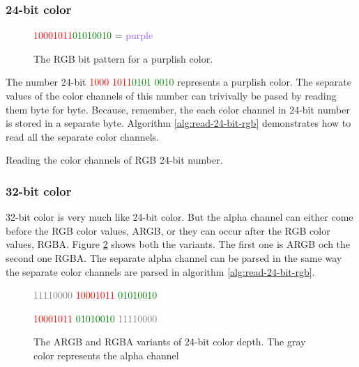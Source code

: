 \subsubsection{24-bit color}

\begin{figure}
  \centering
  {\huge\textcolor{red}{10001011}\textcolor{green}{01010010}\textcolor{blue}{\fullbyte}
    = \textcolor[HTML]{8B52FF}{purple}}
  \caption{The RGB bit pattern for a purplish color.}
  \label{fig:24-bit-colors-bits}
\end{figure}

The number 24-bit \textcolor{red}{1000 1011}\textcolor{green}{0101
  0010}\textcolor{blue}{\fullbyte} represents a purplish color. The
separate values of the color channels of this number can trivivally
be pased by reading them byte for byte. Because, remember, the each
color channel in 24-bit number is stored in a separate
byte. Algorithm \ref{alg:read-24-bit-rgb} demonstrates how to read
all the separate color channels.


\begin{algorithm}[H]
  \caption{Reading the color channels of RGB 24-bit number.}
  \label{alg:read-24-bit-rgb}
  \begin{algorithmic}[1]
  \end{algorithmic}
\end{algorithm}

\subsubsection{32-bit color}

32-bit color is very much like 24-bit color. But the alpha channel
can either come before the RGB color values, ARGB, or
they can occur after the RGB color values, RGBA. Figure
\ref{fig:32-bit-colors-bits} shows both the variants. The first one
is ARGB och the second one RGBA. The separate alpha channel can be
parsed in the same way the separate color channels are parsed in
algorithm \ref{alg:read-24-bit-rgb}.

\begin{figure}
  \centering
  {\Large%
    \textcolor{gray}{11110000}%
    \textcolor{red}{10001011}%
    \textcolor{green}{01010010}%
    \textcolor{blue}{\fullbyte}

    \textcolor{red}{10001011}%
    \textcolor{green}{01010010}%
    \textcolor{blue}{\fullbyte}%
    \textcolor{gray}{11110000}%
  }

  \caption{The ARGB and RGBA variants of 24-bit color depth. The
    gray color represents the alpha channel }
  \label{fig:32-bit-colors-bits}
\end{figure}

